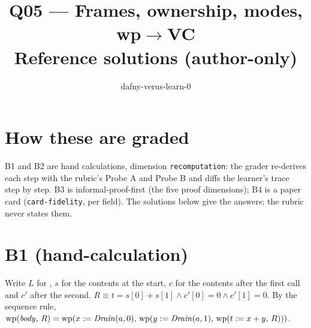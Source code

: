 \documentclass[11pt]{article}
\title{Q05 --- Frames, ownership, modes, wp$\to$VC \\ \large Reference solutions (author-only)}
\author{dafny-verus-learn-0}
\date{}
\begin{document}
\maketitle

\section*{How these are graded}
B1 and B2 are hand calculations, dimension \texttt{recomputation}: the grader
re-derives each step with the rubric's Probe A and Probe B and diffs the
learner's trace step by step. B3 is informal-proof-first (the five proof
dimensions); B4 is a paper card (\texttt{card-fidelity}, per field). The
solutions below give the answers; the rubric never states them.

\section*{B1 (hand-calculation)}

Write $L$ for , $s$ for the contents at the start, $c$ for the
contents after the first call and $c'$ after the second.
$R \equiv t = s[0] + s[1] \wedge c'[0] = 0 \wedge c'[1] = 0$. By the sequence
rule, $\mathrm{wp}(\mathit{body},\,R) = \mathrm{wp}(x \mathrel{:=} \mathit{Drain}(a,0),\,\mathrm{wp}(y \mathrel{:=}
\mathit{Drain}(a,1),\,\mathrm{wp}(t \mathrel{:=} x + y,\,R)))$.
\end{document}
